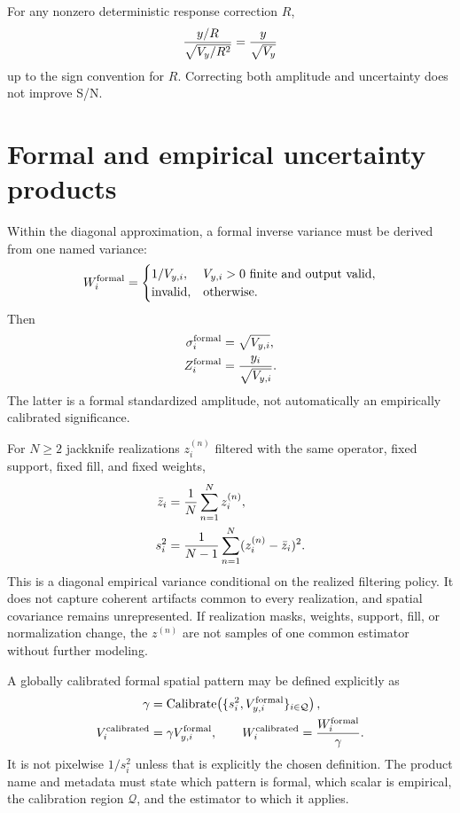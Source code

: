 \documentclass[11pt]{article}
\newcommand{\invalid}{\mathrm{invalid}}
\begin{document}
For any nonzero deterministic response correction $R$,
\begin{equation}
 {y/R\over\sqrt{V_y/R^2}}={y\over\sqrt{V_y}}
 \label{eq:snr-response-invariance}
\end{equation}
up to the sign convention for $R$.  Correcting both amplitude and uncertainty
does not improve S/N.

\section{Formal and empirical uncertainty products}
\label{sec:uncertainty}

Within the diagonal approximation, a formal inverse variance must be derived
from one named variance:
\begin{equation}
 W_i^{\rm formal}=
 \begin{cases}
 1/V_{y,i},&V_{y,i}>0\hbox{ finite and output valid},\\
 \invalid,&\hbox{otherwise}.
 \end{cases}
 \label{eq:formal-weight}
\end{equation}
Then
\begin{align}
 \sigma_i^{\rm formal}&=\sqrt{V_{y,i}},
 \label{eq:formal-sigma}\\
 Z_i^{\rm formal}&={y_i\over\sqrt{V_{y,i}}}.
 \label{eq:formal-standardized}
\end{align}
The latter is a formal standardized amplitude, not automatically an
empirically calibrated significance.

For $N\ge2$ jackknife realizations $z_i^{(n)}$ filtered with the same operator,
fixed support, fixed fill, and fixed weights,
\begin{align}
 \bar z_i&={1\over N}\sum_{n=1}^Nz_i^{(n)},
 \label{eq:jackknife-mean}\\
 s_i^2&={1\over N-1}\sum_{n=1}^N(z_i^{(n)}-\bar z_i)^2.
 \label{eq:jackknife-var}
\end{align}
This is a diagonal empirical variance conditional on the realized filtering
policy.  It does not capture coherent artifacts common to every realization,
and spatial covariance remains unrepresented.  If realization masks, weights,
support, fill, or normalization change, the $z^{(n)}$ are not samples of one
common estimator without further modeling.

A globally calibrated formal spatial pattern may be defined explicitly as
\begin{align}
 \gamma&=\operatorname{Calibrate}\!\left(
   \{s_i^2,V_{y,i}^{\rm formal}\}_{i\in\mathcal Q}\right),
 \label{eq:global-calibration}\\
 V_i^{\rm calibrated}&=\gamma V_{y,i}^{\rm formal},\qquad
 W_i^{\rm calibrated}={W_i^{\rm formal}\over\gamma}.
 \label{eq:calibrated-weight}
\end{align}
It is not pixelwise $1/s_i^2$ unless that is explicitly the chosen definition.
The product name and metadata must state which pattern is formal, which scalar
is empirical, the calibration region $\mathcal Q$, and the estimator to which
it applies.
\end{document}
